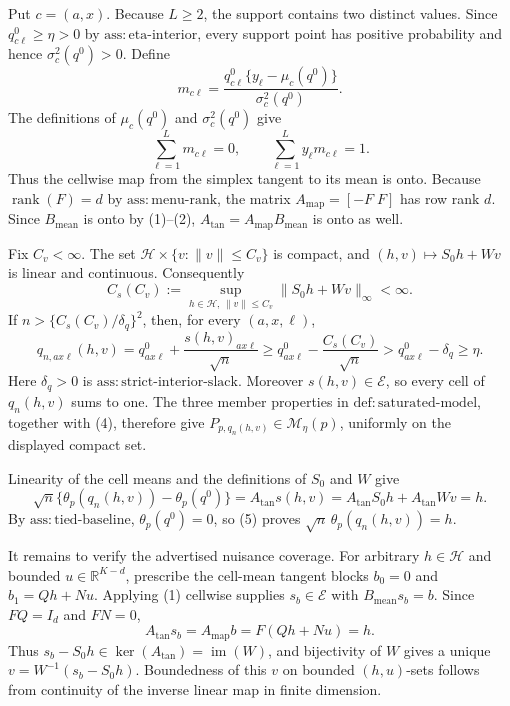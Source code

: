 Put \(c=(a,x)\). Because \(L\ge2\), the support contains two distinct values. Since \(q^0_{c\ell}\ge\eta>0\) by \(\mathrm{ass:eta\text{-}interior}\), every support point has positive probability and hence \(\sigma_c^2(q^0)>0\). Define
\[
m_{c\ell}=\frac{q^0_{c\ell}\{y_\ell-\mu_c(q^0)\}}{\sigma_c^2(q^0)}.
\tag{1}
\]
The definitions of \(\mu_c(q^0)\) and \(\sigma_c^2(q^0)\) give
\[
\sum_{\ell=1}^L m_{c\ell}=0,
\qquad
\sum_{\ell=1}^L y_\ell m_{c\ell}=1.
\tag{2}
\]
Thus the cellwise map from the simplex tangent to its mean is onto. Because \(\operatorname{rank}(F)=d\) by \(\mathrm{ass:menu\text{-}rank}\), the matrix \(A_{\mathrm{map}}=[-F\;F]\) has row rank \(d\). Since \(B_{\mathrm{mean}}\) is onto by (1)--(2), \(A_{\mathrm{tan}}=A_{\mathrm{map}}B_{\mathrm{mean}}\) is onto as well.

Fix \(C_v<\infty\). The set \(\mathcal H\times\{v:\lVert v\rVert\le C_v\}\) is compact, and \((h,v)\mapsto S_0h+Wv\) is linear and continuous. Consequently
\[
C_s(C_v):=\sup_{h\in\mathcal H,\,\lVert v\rVert\le C_v}
\lVert S_0h+Wv\rVert_\infty<\infty.
\tag{3}
\]
If \(n>\{C_s(C_v)/\delta_q\}^2\), then, for every \((a,x,\ell)\),
\[
q_{n,ax\ell}(h,v)
=q^0_{ax\ell}+\frac{s(h,v)_{ax\ell}}{\sqrt n}
\ge q^0_{ax\ell}-\frac{C_s(C_v)}{\sqrt n}
>q^0_{ax\ell}-\delta_q\ge\eta.
\tag{4}
\]
Here \(\delta_q>0\) is \(\mathrm{ass:strict\text{-}interior\text{-}slack}\). Moreover \(s(h,v)\in\mathcal E\), so every cell of \(q_n(h,v)\) sums to one. The three member properties in \(\mathrm{def:saturated\text{-}model}\), together with (4), therefore give \(P_{p,q_n(h,v)}\in\mathcal M_\eta(p)\), uniformly on the displayed compact set.

Linearity of the cell means and the definitions of \(S_0\) and \(W\) give
\[
\sqrt n\{\theta_p(q_n(h,v))-\theta_p(q^0)\}
=A_{\mathrm{tan}}s(h,v)
=A_{\mathrm{tan}}S_0h+A_{\mathrm{tan}}Wv=h.
\tag{5}
\]
By \(\mathrm{ass:tied\text{-}baseline}\), \(\theta_p(q^0)=0\), so (5) proves \(\sqrt n\,\theta_p(q_n(h,v))=h\).

It remains to verify the advertised nuisance coverage. For arbitrary \(h\in\mathcal H\) and bounded \(u\in\mathbb R^{K-d}\), prescribe the cell-mean tangent blocks \(b_0=0\) and \(b_1=Qh+Nu\). Applying (1) cellwise supplies \(s_b\in\mathcal E\) with \(B_{\mathrm{mean}}s_b=b\). Since \(FQ=I_d\) and \(FN=0\),
\[
A_{\mathrm{tan}}s_b=A_{\mathrm{map}}b=F(Qh+Nu)=h.
\]
Thus \(s_b-S_0h\in\ker(A_{\mathrm{tan}})=\operatorname{im}(W)\), and bijectivity of \(W\) gives a unique \(v=W^{-1}(s_b-S_0h)\). Boundedness of this \(v\) on bounded \((h,u)\)-sets follows from continuity of the inverse linear map in finite dimension.

